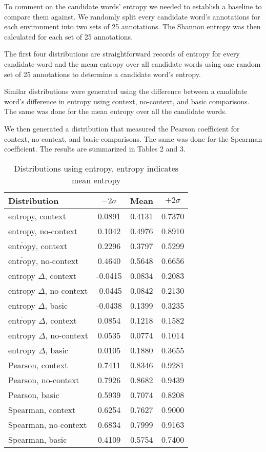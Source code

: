 \documentclass[11pt]{article}
\begin{document}
\begin{description}
To comment on the candidate words' entropy we needed to establish a baseline to compare them against. We randomly split every candidate word's annotations for each environment into two sets of 25 annotations. The Shannon entropy was then calculated for each set of 25 annotations. 

The first four distributions are straightforward records of entropy for every candidate word and the mean entropy over all candidate words using one random set of 25 annotations to determine a candidate word's entropy.

Similar distributions were generated using the difference between a candidate word's difference in entropy using context, no-context, and basic comparisons. The same was done for the mean entropy over all the candidate words.

We then generated a distribution that measured the Pearson coefficient for context, no-context, and basic comparisons. The same was done for the Spearman coefficient. The results are summarized in Tables 2 and 3.

\begin{table}
\centering
\begin{tabular}{l | c | c | c}
Distribution & $-2\sigma$ & Mean & $+2\sigma$\\
\hline
entropy, context & 0.0891 & 0.4131 & 0.7370 \\
entropy, no-context & 0.1042 & 0.4976 & 0.8910 \\
$\overline{\text{entropy}}$, context & 0.2296 & 0.3797 & 0.5299 \\
$\overline{\text{entropy}}$, no-context & 0.4640 & 0.5648 & 0.6656 \\
entropy $\Delta$, context  & -0.0415 & 0.0834 & 0.2083 \\
entropy $\Delta$, no-context  & -0.0445 & 0.0842 & 0.2130 \\
entropy $\Delta$, basic & -0.0438 & 0.1399 & 0.3235 \\
$\overline{\text{entropy}}$ $\Delta$, context  & 0.0854 & 0.1218 & 0.1582 \\
$\overline{\text{entropy}}$ $\Delta$, no-context  & 0.0535 & 0.0774 & 0.1014 \\
$\overline{\text{entropy}}$ $\Delta$, basic & 0.0105 & 0.1880 & 0.3655 \\
Pearson, context & 0.7411 & 0.8346 & 0.9281 \\
Pearson, no-context & 0.7926 & 0.8682 & 0.9439 \\
Pearson, basic & 0.5939 & 0.7074 & 0.8208 \\
Spearman, context & 0.6254 & 0.7627 & 0.9000 \\
Spearman, no-context & 0.6834 & 0.7999 & 0.9163 \\
Spearman, basic & 0.4109 & 0.5754 & 0.7400 \\
\end{tabular}
\caption{\scriptsize Distributions using entropy, $\overline{\text{entropy}}$ indicates mean entropy \scriptsize}
\label{tab:myfirsttable}
\end{table}



\end{description}
\end{document}
